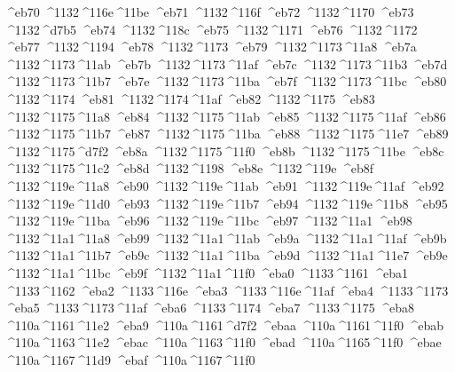 \checkit ^^^^eb70 ^^^^1132^^^^116e^^^^11be
\checkit ^^^^eb71 ^^^^1132^^^^116f
\checkit ^^^^eb72 ^^^^1132^^^^1170
\checkit ^^^^eb73 ^^^^1132^^^^d7b5
\checkit ^^^^eb74 ^^^^1132^^^^118c
\checkit ^^^^eb75 ^^^^1132^^^^1171
\checkit ^^^^eb76 ^^^^1132^^^^1172
\checkit ^^^^eb77 ^^^^1132^^^^1194
\checkit ^^^^eb78 ^^^^1132^^^^1173
\checkit ^^^^eb79 ^^^^1132^^^^1173^^^^11a8
\checkit ^^^^eb7a ^^^^1132^^^^1173^^^^11ab
\checkit ^^^^eb7b ^^^^1132^^^^1173^^^^11af
\checkit ^^^^eb7c ^^^^1132^^^^1173^^^^11b3
\checkit ^^^^eb7d ^^^^1132^^^^1173^^^^11b7
\checkit ^^^^eb7e ^^^^1132^^^^1173^^^^11ba
\checkit ^^^^eb7f ^^^^1132^^^^1173^^^^11bc
\checkit ^^^^eb80 ^^^^1132^^^^1174
\checkit ^^^^eb81 ^^^^1132^^^^1174^^^^11af
\checkit ^^^^eb82 ^^^^1132^^^^1175
\checkit ^^^^eb83 ^^^^1132^^^^1175^^^^11a8
\checkit ^^^^eb84 ^^^^1132^^^^1175^^^^11ab
\checkit ^^^^eb85 ^^^^1132^^^^1175^^^^11af
\checkit ^^^^eb86 ^^^^1132^^^^1175^^^^11b7
\checkit ^^^^eb87 ^^^^1132^^^^1175^^^^11ba
\checkit ^^^^eb88 ^^^^1132^^^^1175^^^^11e7
\checkit ^^^^eb89 ^^^^1132^^^^1175^^^^d7f2
\checkit ^^^^eb8a ^^^^1132^^^^1175^^^^11f0
\checkit ^^^^eb8b ^^^^1132^^^^1175^^^^11be
\checkit ^^^^eb8c ^^^^1132^^^^1175^^^^11c2
\checkit ^^^^eb8d ^^^^1132^^^^1198
\checkit ^^^^eb8e ^^^^1132^^^^119e
\checkit ^^^^eb8f ^^^^1132^^^^119e^^^^11a8
\checkit ^^^^eb90 ^^^^1132^^^^119e^^^^11ab
\checkit ^^^^eb91 ^^^^1132^^^^119e^^^^11af
\checkit ^^^^eb92 ^^^^1132^^^^119e^^^^11d0
\checkit ^^^^eb93 ^^^^1132^^^^119e^^^^11b7
\checkit ^^^^eb94 ^^^^1132^^^^119e^^^^11b8
\checkit ^^^^eb95 ^^^^1132^^^^119e^^^^11ba
\checkit ^^^^eb96 ^^^^1132^^^^119e^^^^11bc
\checkit ^^^^eb97 ^^^^1132^^^^11a1
\checkit ^^^^eb98 ^^^^1132^^^^11a1^^^^11a8
\checkit ^^^^eb99 ^^^^1132^^^^11a1^^^^11ab
\checkit ^^^^eb9a ^^^^1132^^^^11a1^^^^11af
\checkit ^^^^eb9b ^^^^1132^^^^11a1^^^^11b7
\checkit ^^^^eb9c ^^^^1132^^^^11a1^^^^11ba
\checkit ^^^^eb9d ^^^^1132^^^^11a1^^^^11e7
\checkit ^^^^eb9e ^^^^1132^^^^11a1^^^^11bc
\checkit ^^^^eb9f ^^^^1132^^^^11a1^^^^11f0
\checkit ^^^^eba0 ^^^^1133^^^^1161
\checkit ^^^^eba1 ^^^^1133^^^^1162
\checkit ^^^^eba2 ^^^^1133^^^^116e
\checkit ^^^^eba3 ^^^^1133^^^^116e^^^^11af
\checkit ^^^^eba4 ^^^^1133^^^^1173
\checkit ^^^^eba5 ^^^^1133^^^^1173^^^^11af
\checkit ^^^^eba6 ^^^^1133^^^^1174
\checkit ^^^^eba7 ^^^^1133^^^^1175
\checkit ^^^^eba8 ^^^^110a^^^^1161^^^^11e2
\checkit ^^^^eba9 ^^^^110a^^^^1161^^^^d7f2
\checkit ^^^^ebaa ^^^^110a^^^^1161^^^^11f0
\checkit ^^^^ebab ^^^^110a^^^^1163^^^^11e2
\checkit ^^^^ebac ^^^^110a^^^^1163^^^^11f0
\checkit ^^^^ebad ^^^^110a^^^^1165^^^^11f0
\checkit ^^^^ebae ^^^^110a^^^^1167^^^^11d9
\checkit ^^^^ebaf ^^^^110a^^^^1167^^^^11f0
